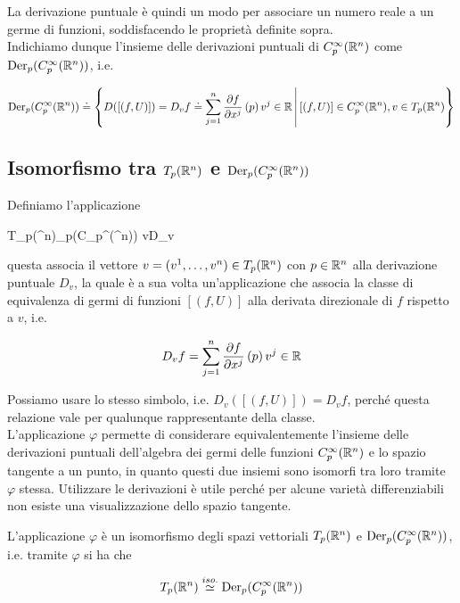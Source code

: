 La derivazione puntuale è quindi un modo per associare un numero reale a un germe di funzioni, soddisfacendo le proprietà definite sopra. \\
Indichiamo dunque l'insieme delle derivazioni puntuali di $ C_{p}^{\infty}(\mathbb{R}^{n}) $ come $ \operatorname{Der}_{p}(C_{p}^{\infty}(\mathbb{R}^{n})) $, i.e.

\begin{equation}
	\operatorname{Der}_{p}(C_{p}^{\infty}(\mathbb{R}^{n})) \doteq \left\{ D ([(f,U)]) = D_{v} f \doteq \sum_{j=1}^{n} \pdv{f}{x^{j}} \, (p) \, v^{j} \in \mathbb{R} \, \middle| \, [(f,U)] \in C_{p}^{\infty}(\mathbb{R}^{n}), v \in T_{p} (\mathbb{R}^{n}) \right\}
\end{equation}

\subsection{Isomorfismo tra $ T_{p}(\mathbb{R}^{n}) $ e $ \operatorname{Der}_{p}(C_{p}^{\infty}(\mathbb{R}^{n})) $}

Definiamo l'applicazione

\map{\varphi}
	{T_{p}(\R^{n})}{\der_{p}(C_{p}^{\infty}(\R^{n}))}
	{v}{D_{v}}

questa associa il vettore $ v = (v^{1},\dots,v^{n}) \in T_{p}(\mathbb{R}^{n}) $ con $ p \in \mathbb{R}^{n} $ alla derivazione puntuale $ D_{v} $, la quale è a sua volta un'applicazione che associa la classe di equivalenza di germi di funzioni $ [(f,U)] $ alla derivata direzionale di $ f $ rispetto a $ v $, i.e.

\begin{align}
	D_{v} f = \sum_{j=1}^{n} \pdv{f}{x^{j}} \, (p) \, v^{j} \in \mathbb{R}
\end{align}

Possiamo usare lo stesso simbolo, i.e. $ D_{v} ([(f,U)]) = D_{v} f $, perché questa relazione vale per qualunque rappresentante della classe. \\
L'applicazione $ \varphi $ permette di considerare equivalentemente l'insieme delle derivazioni puntuali dell'algebra dei germi delle funzioni $ C_{p}^{\infty}(\mathbb{R}^{n}) $ e lo spazio tangente a un punto, in quanto questi due insiemi sono isomorfi tra loro tramite $ \varphi $ stessa. Utilizzare le derivazioni è utile perché per alcune varietà differenziabili non esiste una visualizzazione dello spazio tangente.

\begin{theorem}
	L'applicazione $ \varphi $ è un isomorfismo degli spazi vettoriali $ T_{p}(\mathbb{R}^{n}) $ e $ \operatorname{Der}_{p}(C_{p}^{\infty}(\mathbb{R}^{n})) $, i.e. tramite $ \varphi $ si ha che
	
	\begin{equation}
		T_{p}(\mathbb{R}^{n}) \stackrel{iso.}{\simeq} \operatorname{Der}_{p}(C_{p}^{\infty}(\mathbb{R}^{n}))
	\end{equation}
\end{theorem}

